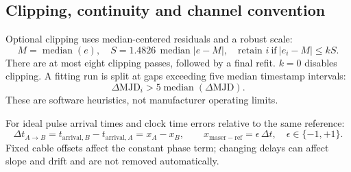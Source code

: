\documentclass[11pt,a4paper]{article}
\begin{document}
\subsection{Clipping, continuity and channel convention}
Optional clipping uses median-centered residuals and a robust scale:
\begin{equation}
M=\operatorname{median}(e),\quad
S=1.4826\,\operatorname{median}|e-M|,\quad
\text{retain }i\ \text{if}\ |e_i-M|\le kS. \tag{A10}
\end{equation}
There are at most eight clipping passes, followed by a final refit. \(k=0\)
disables clipping. A fitting run is split at gaps exceeding five median
timestamp intervals:
\begin{equation}
\Delta\mathrm{MJD}_i>5\operatorname{median}(\Delta\mathrm{MJD}). \tag{A11}
\end{equation}
These are software heuristics, not manufacturer operating limits.

For ideal pulse arrival times and clock time errors relative to the same
reference:
\begin{equation}
\Delta t_{A\rightarrow B}=t_{\mathrm{arrival},B}-t_{\mathrm{arrival},A}
=x_A-x_B,\qquad x_{\mathrm{maser-ref}}=\epsilon\,\Delta t,\quad
\epsilon\in\{-1,+1\}. \tag{A12}
\end{equation}
Fixed cable offsets affect the constant phase term; changing delays can affect
slope and drift and are not removed automatically.
\end{document}
